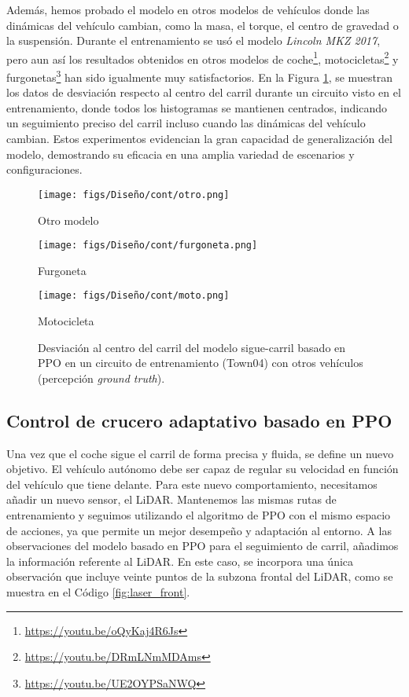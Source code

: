 Además, hemos probado el modelo en otros modelos de vehículos donde las dinámicas del vehículo cambian, como la masa, el torque, el centro de gravedad o la suspensión. Durante el entrenamiento se usó el modelo \textit{Lincoln MKZ 2017}, pero aun así los resultados obtenidos en otros modelos de coche\footnote{\url{https://youtu.be/oQyKaj4R6Js}}, motocicletas\footnote{\url{https://youtu.be/DRmLNmMDAms}} y furgonetas\footnote{\url{https://youtu.be/UE2OYPSaNWQ}} han sido igualmente muy satisfactorios. En la Figura \ref{fig:ppo_carril_din}, se muestran los datos de desviación respecto al centro del carril durante un circuito visto en el entrenamiento, donde todos los histogramas se mantienen centrados, indicando un seguimiento preciso del carril incluso cuando las dinámicas del vehículo cambian. Estos experimentos evidencian la gran capacidad de generalización del modelo, demostrando su eficacia en una amplia variedad de escenarios y configuraciones.
\begin{figure}[ht]
\centering
\begin{minipage}{0.32\textwidth}
    \centering
    \texttt{[image: figs/Diseño/cont/otro.png]}
    \caption{Otro modelo}
\end{minipage}%
\begin{minipage}{0.32\textwidth}
    \centering
    \texttt{[image: figs/Diseño/cont/furgoneta.png]}
    \caption{Furgoneta}
\end{minipage}%
\begin{minipage}{0.32\textwidth}
    \centering
    \texttt{[image: figs/Diseño/cont/moto.png]}
    \caption{Motocicleta}
\end{minipage}
\caption{Desviación al centro del carril del modelo sigue-carril basado en \ac{PPO} en un circuito de entrenamiento (Town04) con otros vehículos (percepción \textit{ground truth}).}
\label{fig:ppo_carril_din}
\end{figure}

\newpage

\subsection{Control de crucero adaptativo basado en PPO}

Una vez que el coche sigue el carril de forma precisa y fluida, se define un nuevo objetivo. El vehículo autónomo debe ser capaz de regular su velocidad en función del vehículo que tiene delante. Para este nuevo comportamiento, necesitamos añadir un nuevo sensor, el \ac{LiDAR}. Mantenemos las mismas rutas de entrenamiento y seguimos utilizando el algoritmo de \ac{PPO} con el mismo espacio de acciones, ya que permite un mejor desempeño y adaptación al entorno. A las observaciones del modelo basado en \ac{PPO} para el seguimiento de carril, añadimos la información referente al \ac{LiDAR}. En este caso, se incorpora una única observación que incluye veinte puntos de la subzona frontal del \ac{LiDAR}, como se muestra en el Código \ref{fig:laser_front}.

